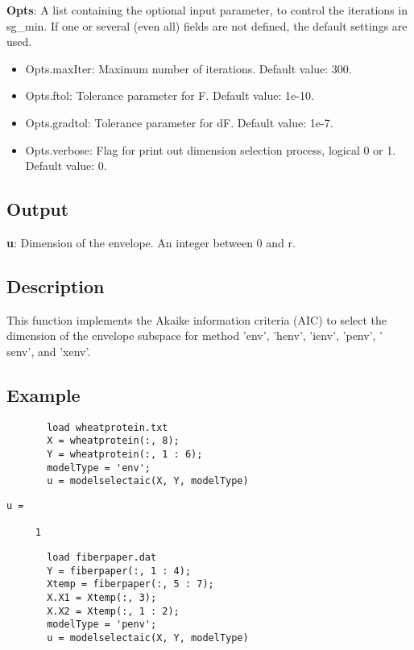 \documentclass[a4paper,11pt,openany]{memoir}
\begin{document}
\begin{par}
\textbf{Opts}: A list containing the optional input parameter, to control the iterations in sg\_min. If one or several (even all) fields are not defined, the default settings are used.
\end{par} \vspace{1em}
\begin{itemize}
\setlength{\itemsep}{-1ex}
   \item Opts.maxIter: Maximum number of iterations.  Default value: 300.
   \item Opts.ftol: Tolerance parameter for F.  Default value: 1e-10.
   \item Opts.gradtol: Tolerance parameter for dF.  Default value: 1e-7.
   \item Opts.verbose: Flag for print out dimension selection process, logical 0 or 1. Default value: 0.
\end{itemize}


\subsection*{Output}

\begin{par}
\textbf{u}: Dimension of the envelope. An integer between 0 and r.
\end{par} \vspace{1em}


\subsection*{Description}

\begin{par}
This function implements the Akaike information criteria (AIC) to select the dimension of the envelope subspace for method 'env', 'henv', 'ienv', 'penv', ' senv', and 'xenv'.
\end{par} \vspace{1em}


\subsection*{Example}


\begin{verbatim}       load wheatprotein.txt
       X = wheatprotein(:, 8);
       Y = wheatprotein(:, 1 : 6);
       modelType = 'env';
       u = modelselectaic(X, Y, modelType)\end{verbatim}
\color{lightgray}\ttfamily\begin{verbatim}
u =

     1

\end{verbatim}  \rmfamily
\color{black}
\begin{verbatim}       load fiberpaper.dat
       Y = fiberpaper(:, 1 : 4);
       Xtemp = fiberpaper(:, 5 : 7);
       X.X1 = Xtemp(:, 3);
       X.X2 = Xtemp(:, 1 : 2);
       modelType = 'penv';
       u = modelselectaic(X, Y, modelType)\end{verbatim}
    
\end{document}
